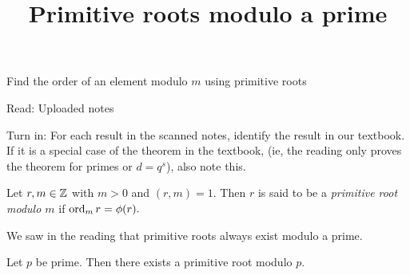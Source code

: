 \documentclass{ximera}
\title{Primitive roots modulo a prime}
\begin{document}
\begin{abstract}
\end{abstract}
\maketitle


\begin{obj}
    \item Find the order of an element modulo $m$ using primitive roots
\end{obj}

\begin{pre}
    \item[Read:] Uploaded notes
    \item[Turn in:] For each result in the scanned notes, identify the result in our textbook. If it is a special case of the theorem in the textbook, (ie, the reading only proves the theorem for primes or $d=q^s$), also note this.

\end{pre}
    


\begin{definition}\label{defn:prime-root}
    Let $r,m\in\mathbb Z$ with $m>0$ and $(r,m)=1.$ Then $r$ is said to be a \emph{primitive root modulo $m$} if $\operatorname{ord}_m r=\phi(r).$
\end{definition}

We saw in the reading that primitive roots always exist modulo a prime. 
\begin{theorem}\label{thm:prime-roots}
    Let $p$ be prime. Then there exists a primitive root modulo $p.$
\end{theorem}
\end{document}
